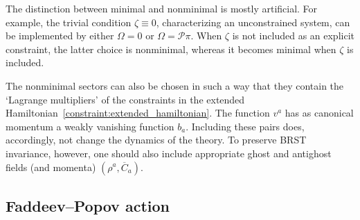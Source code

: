     \begin{remark}
        The distinction between minimal and nonminimal is mostly artificial. For example, the trivial condition $\zeta\equiv0$, characterizing an unconstrained system, can be implemented by either $\Omega=0$ or $\Omega=\mathcal{P}\pi$. When $\zeta$ is not included as an explicit constraint, the latter choice is nonminimal, whereas it becomes minimal when $\zeta$ is included.
    \end{remark}

    The nonminimal sectors can also be chosen in such a way that they contain the `Lagrange multipliers' of the constraints in the extended Hamiltonian~\eqref{constraint:extended_hamiltonian}. The function $v^a$ has as canonical momentum a weakly vanishing function $b_a$. Including these pairs does, accordingly, not change the dynamics of the theory. To preserve BRST invariance, however, one should also include appropriate ghost and antighost fields (and momenta) $(\rho^a,\overline{C}_a)$.

\subsection{Faddeev--Popov action}

